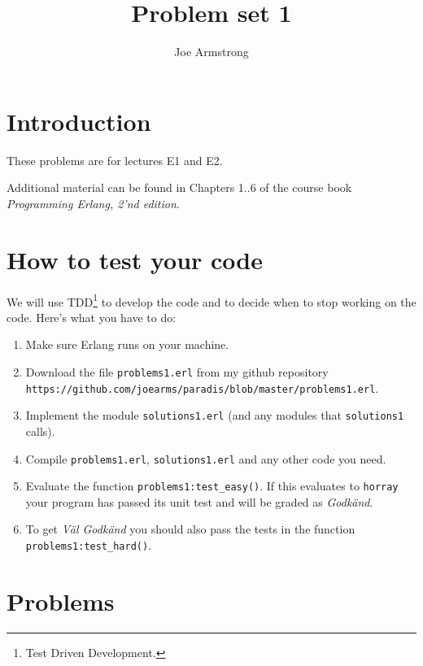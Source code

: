 \documentclass[12pt]{hitec}
\title{Problem set 1}
\author{Joe Armstrong}
\begin{document}
\maketitle

\tableofcontents

\section{Introduction}

These problems are for lectures E1 and E2.

Additional material can be found in Chapters 1..6 of
the course book {\sl Programming Erlang, 2'nd edition}. 

\section{How to test your code}

We will use TDD\footnote{Test Driven Development.} to develop the code
and to decide when to stop working on the code.
Here's what you have to do:

\begin{enumerate}
\item Make sure Erlang runs on your machine.

\item Download the file \verb+problems1.erl+ from my github repository
\newline
  \verb+https://github.com/joearms/paradis/blob/master/problems1.erl+.

\item Implement the module \verb+solutions1.erl+ (and any modules
that \verb+solutions1+ calls).

\item Compile \verb+problems1.erl+, \verb+solutions1.erl+ and
any other code you need.

\item Evaluate the function \verb+problems1:test_easy()+. If this
  evaluates to \verb+horray+ your program has passed
  its unit test and will be graded as {\sl Godk\"{a}nd}.

\item To get {\sl V\"{a}l Godk\"{a}nd} you should also pass the tests
  in the function \verb+problems1:test_hard()+.

\end{enumerate}

\section{Problems}
\end{document}
